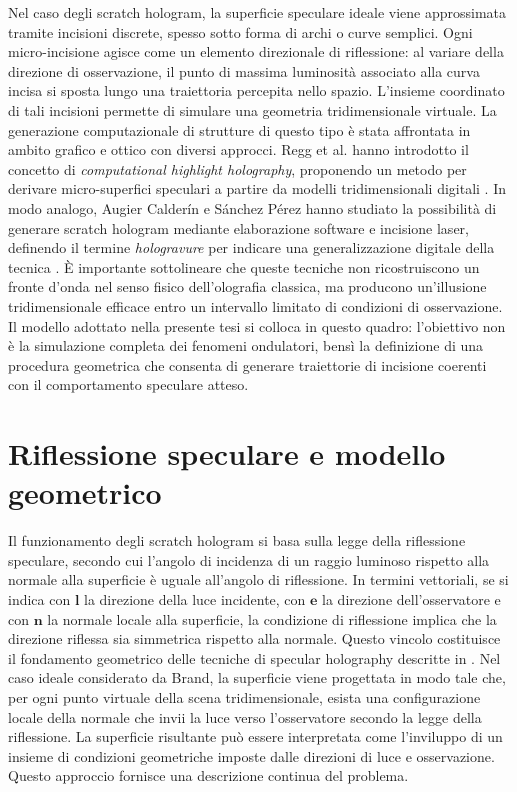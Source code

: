 \documentclass[a4paper,11pt,titlepage,twoside]{book}
\newcommand{\1}{\mathbf{1}}
\numberwithin{equation}{chapter}
\theoremstyle{plain}
\theoremstyle{definition}
\begin{document}
	Nel caso degli scratch hologram, la superficie speculare ideale viene approssimata tramite incisioni discrete, spesso sotto forma di archi o curve semplici. Ogni micro-incisione agisce come un elemento direzionale di riflessione: al variare della direzione di osservazione, il punto di massima luminosità associato alla curva incisa si sposta lungo una traiettoria percepita nello spazio. L’insieme coordinato di tali incisioni permette di simulare una geometria tridimensionale virtuale.
	La generazione computazionale di strutture di questo tipo è stata affrontata in ambito grafico e ottico con diversi approcci. Regg et al. hanno introdotto il concetto di \emph{computational highlight holography}, proponendo un metodo per derivare micro-superfici speculari a partire da modelli tridimensionali digitali \cite{Regg2010}. In modo analogo, Augier Calderín e Sánchez Pérez hanno studiato la possibilità di generare scratch hologram mediante elaborazione software e incisione laser, definendo il termine \emph{hologravure} per indicare una generalizzazione digitale della tecnica \cite{Augier2008, Hologravure2011}.
	È importante sottolineare che queste tecniche non ricostruiscono un fronte d’onda nel senso fisico dell’olografia classica, ma producono un’illusione tridimensionale efficace entro un intervallo limitato di condizioni di osservazione. Il modello adottato nella presente tesi si colloca in questo quadro: l’obiettivo non è la simulazione completa dei fenomeni ondulatori, bensì la definizione di una procedura geometrica che consenta di generare traiettorie di incisione coerenti con il comportamento speculare atteso.
	


	\section{Riflessione speculare e modello geometrico}
	
	Il funzionamento degli scratch hologram si basa sulla legge della riflessione speculare, secondo cui l’angolo di incidenza di un raggio luminoso rispetto alla normale alla superficie è uguale all’angolo di riflessione. In termini vettoriali, se si indica con $\mathbf{l}$ la direzione della luce incidente, con $\mathbf{e}$ la direzione dell’osservatore e con $\mathbf{n}$ la normale locale alla superficie, la condizione di riflessione implica che la direzione riflessa sia simmetrica rispetto alla normale. Questo vincolo costituisce il fondamento geometrico delle tecniche di specular holography descritte in \cite{Brand2011}.
	Nel caso ideale considerato da Brand, la superficie viene progettata in modo tale che, per ogni punto virtuale della scena tridimensionale, esista una configurazione locale della normale che invii la luce verso l’osservatore secondo la legge della riflessione. La superficie risultante può essere interpretata come l’inviluppo di un insieme di condizioni geometriche imposte dalle direzioni di luce e osservazione. Questo approccio fornisce una descrizione continua del problema.
	
\end{document}
